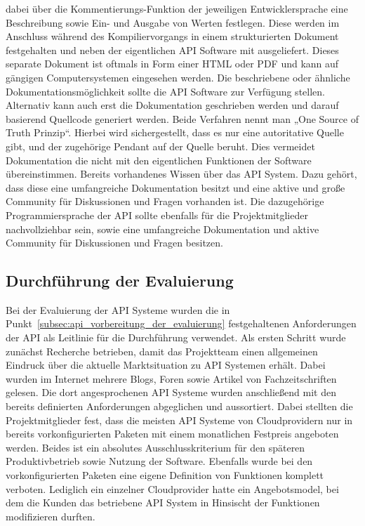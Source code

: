 \begin{outline}
  dabei über die Kommentierungs-Funktion der jeweiligen Entwicklersprache eine
  Beschreibung sowie Ein- und Ausgabe von Werten festlegen. Diese werden im
  Anschluss während des Kompiliervorgangs in einem strukturierten Dokument
  festgehalten und neben der eigentlichen API Software mit ausgeliefert. Dieses
  separate Dokument ist oftmals in Form einer HTML oder PDF und kann auf
  gängigen Computersystemen eingesehen werden. Die beschriebene oder ähnliche
  Dokumentationsmöglichkeit sollte die API Software zur Verfügung stellen.
  Alternativ kann auch erst die Dokumentation geschrieben werden und darauf
  basierend Quellcode generiert werden. Beide Verfahren nennt man „One Source
  of Truth Prinzip“. Hierbei wird sichergestellt, dass es nur eine autoritative
  Quelle gibt, und der zugehörige Pendant auf der Quelle beruht. Dies vermeidet
  Dokumentation die nicht mit den eigentlichen Funktionen der Software
  übereinstimmen.
  \1 Bereits vorhandenes Wissen über das API System. Dazu gehört, dass diese
  eine umfangreiche Dokumentation besitzt und eine aktive und große Community
  für Diskussionen und Fragen vorhanden ist. Die dazugehörige
  Programmiersprache der API sollte ebenfalls für die Projektmitglieder
  nachvollziehbar sein, sowie eine umfangreiche Dokumentation und aktive
  Community für Diskussionen und Fragen besitzen.
\end{outline}
\nl%

\subsection{Durchführung der Evaluierung}
\label{subsec:api_durchfuehrung_der_evaluierung}
Bei der Evaluierung der API Systeme wurden die in
Punkt~\ref{subsec:api_vorbereitung_der_evaluierung} festgehaltenen
Anforderungen der API als Leitlinie für die Durchführung verwendet. Als ersten
Schritt wurde zunächst Recherche betrieben, damit das Projektteam einen
allgemeinen Eindruck über die aktuelle Marktsituation zu API Systemen erhält.
Dabei wurden im Internet mehrere Blogs, Foren sowie Artikel von
Fachzeitschriften gelesen. Die dort angesprochenen API Systeme wurden
anschließend mit den bereits definierten Anforderungen abgeglichen und
aussortiert. Dabei stellten die Projektmitglieder fest, dass die meisten API
Systeme von Cloudprovidern nur in bereits vorkonfigurierten Paketen mit einem
monatlichen Festpreis angeboten werden. Beides ist ein absolutes
Ausschlusskriterium für den späteren Produktivbetrieb sowie Nutzung der
Software. Ebenfalls wurde bei den vorkonfigurierten Paketen eine eigene
Definition von Funktionen komplett verboten. Lediglich ein einzelner
Cloudprovider hatte ein Angebotsmodel, bei dem die Kunden das betriebene API
System in Hinsischt der Funktionen modifizieren durften.

